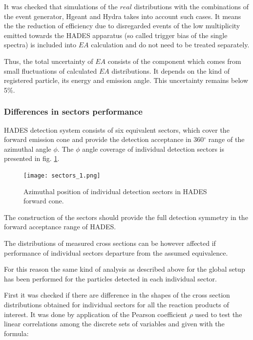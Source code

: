 It was checked that simulations of the $real$ distributions with the combinations of the event generator, Hgeant and Hydra takes into account 
such cases. It means the the reduction 
of efficiency due to disregarded events of 
the low multiplicity emitted towards 
the HADES apparatus (so called trigger bias of the 
single spectra) is included into $EA$ calculation 
and do not need to be treated separately.  

Thus, the total uncertainty of $EA$ consists of the component which comes from small fluctuations of  calculated $EA$ distributions. It depends on the kind of registered particle, its energy and emission angle.
This uncertainty remains below 5\%.


\subsubsection{\label{sect} Differences in sectors performance}


HADES detection system consists of six equivalent sectors, which cover the forward 
emission cone and provide the detection acceptance in 360$^{\circ}$ range of the azimuthal angle $\phi$.
The $\phi$ angle coverage of individual 
detection sectors is presented in fig. \ref{sectors1}.

\begin{figure}
    \centering
    \texttt{[image: sectors\_1.png]}%
    \caption{Azimuthal position of individual detection sectors in HADES forward cone.}
    \label{sectors1}
\end{figure}

The construction of the sectors should provide  the full detection symmetry in the forward acceptance range of HADES.

The distributions of measured cross sections can be however affected if performance of individual sectors  departure from the assumed equivalence.

For this reason the same kind of analysis as described above for the global setup has been performed for the particles detected in each individual sector. 

First it was checked if there are difference in the shapes of the cross section distributions obtained for individual sectors for all the reaction products of interest. It was done by application of the Pearson coefficient $\rho$ used to test the linear correlations among the discrete sets of variables and given with the formula:

